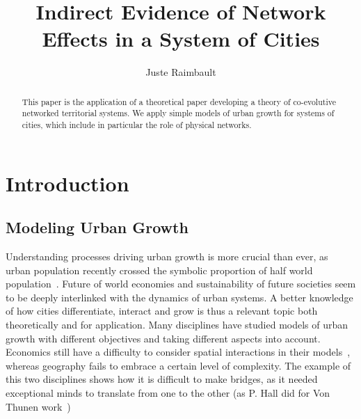 \documentclass[Royal,sageh,times]{sagej}
\begin{document}

\title{Indirect Evidence of Network Effects in a System of Cities}

\author{Juste Raimbault}




\begin{abstract}
This paper is the application of a theoretical paper developing a theory of co-evolutive networked territorial systems. We apply simple models of urban growth for systems of cities, which include in particular the role of physical networks.
\end{abstract}


\maketitle






\section{Introduction}

\subsection{Modeling Urban Growth}

Understanding processes driving urban growth is more crucial than ever, as urban population recently crossed the symbolic proportion of half world population~\cite{}.%
 Future of world economies and sustainability of future societies seem to be deeply interlinked with the dynamics of urban systems.%
 A better knowledge of how cities differentiate, interact and grow is thus a relevant topic both theoretically and for application. Many disciplines have studied models of urban growth with different objectives and taking different aspects into account. Economics still have a difficulty to consider spatial interactions in their models~\cite{krugman1998space}, whereas geography fails to embrace a certain level of complexity. The example of this two disciplines shows how it is difficult to make bridges, as it needed exceptional minds to translate from one to the other (as P. Hall did for Von Thunen work~\cite{taylor2016polymath}) %
\end{document}
